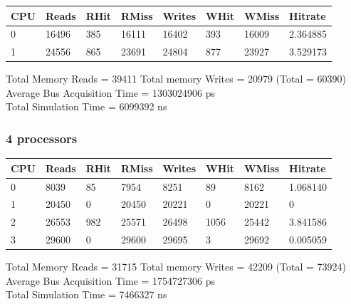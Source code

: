 \documentclass[]{article}
\begin{document}
\begin{table}[H]
	\begin{tabular}{|l|l|l|l|l|l|l|l|}
		\hline
		\textbf{CPU} & \textbf{Reads} & \textbf{RHit} & \textbf{RMiss} & \textbf{Writes} & \textbf{WHit} & \textbf{WMiss} & \textbf{Hitrate} \\ \hline
		0            & 16496          & 385           & 16111          & 16402           & 393           & 16009          & 2.364885         \\ \hline
		1            & 24556          & 865           & 23691          & 24804           & 877           & 23927          & 3.529173         \\ \hline
	\end{tabular}
\end{table}

Total Memory Reads = 39411 Total memory Writes = 20979 (Total = 60390)\\
Average Bus Acquisition Time = 1303024906 ps\\
Total Simulation Time = 6099392 ns

\subsubsection{4 processors}

\begin{table}[H]
	\begin{tabular}{|l|l|l|l|l|l|l|l|}
		\hline
		\textbf{CPU} & \textbf{Reads} & \textbf{RHit} & \textbf{RMiss} & \textbf{Writes} & \textbf{WHit} & \textbf{WMiss} & \textbf{Hitrate} \\ \hline
		0            & 8039           & 85            & 7954           & 8251            & 89            & 8162           & 1.068140         \\ \hline
		1            & 20450          & 0             & 20450          & 20221           & 0             & 20221          & 0                \\ \hline
		2            & 26553          & 982           & 25571          & 26498           & 1056          & 25442          & 3.841586         \\ \hline
		3            & 29600          & 0             & 29600          & 29695           & 3             & 29692          & 0.005059         \\ \hline
	\end{tabular}
\end{table}

Total Memory Reads = 31715 Total memory Writes = 42209 (Total = 73924)\\
Average Bus Acquisition Time = 1754727306 ps\\
Total Simulation Time = 7466327 ns
\end{document}
